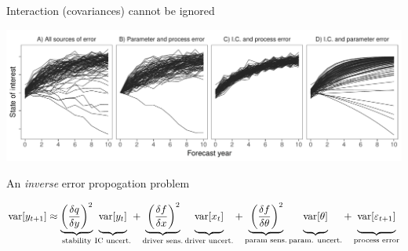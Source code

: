 \documentclass[12pt, compress, aspectratio=1610]{beamer}
\begin{document}
\begin{frame}{%
\protect\hypertarget{interaction-covariances-cannot-be-ignored}{%
Interaction (covariances) cannot be ignored}}

\centering

\includegraphics[width=\textwidth]{./figures/forecast_uncertainty_example.pdf}

\end{frame}

\begin{frame}{%
\protect\hypertarget{an-error-propogation-problem}{%
An \emph{inverse} error propogation problem}}

\small

\begin{align*}
\text{var}[y_{t+1}] \approx \underbrace{\left(\frac{\delta q}{\delta y} \right)^2}_{\text{stability}} 
               \underbrace{\vphantom{ \left(\frac{\delta q}{\delta y} \right)^2 } \text{var}[y_t]}_{\text{IC uncert.}} +
               \underbrace{\vphantom{ \left(\frac{\delta q}{\delta y} \right)^2 }\left(\frac{\delta f}{\delta x} \right)^2}_{\text{driver sens.}} 
               \underbrace{\vphantom{ \left(\frac{\delta q}{\delta y} \right)^2 } \text{var}[x_t]}_{\text{driver uncert.}} +
               \underbrace{\vphantom{ \left(\frac{\delta q}{\delta y} \right)^2 }\left(\frac{\delta f}{\delta \theta} \right)^2}_{\text{param sens.}}
               \underbrace{\vphantom{ \left(\frac{\delta q}{\delta y} \right)^2 } \text{var}[\theta]}_{\text{param. uncert.}} +
               \underbrace{\vphantom{ \left(\frac{\delta q}{\delta y} \right)^2 } \text{var}[\varepsilon_{t+1}]}_{\text{process error}}
\end{align*}

\end{frame}
\end{document}
